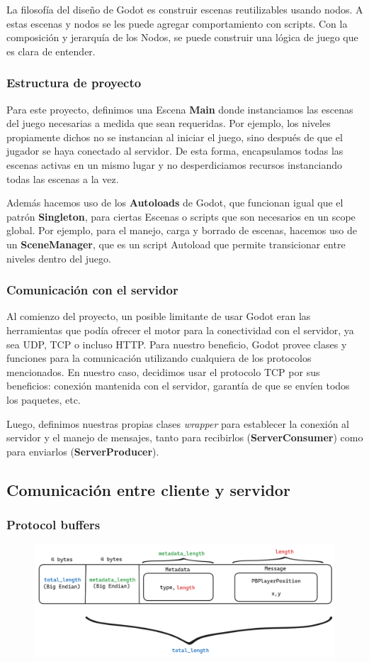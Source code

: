 La filosofía del diseño de Godot es construir escenas reutilizables usando nodos. A estas escenas y nodos se les puede agregar comportamiento con scripts. Con la composición y jerarquía de los Nodos, se puede construir una lógica de juego que es clara de entender.

\subsubsection{Estructura de proyecto}

Para este proyecto, definimos una Escena \textbf{Main} donde instanciamos las escenas del juego necesarias a medida que sean requeridas. Por ejemplo, los niveles propiamente dichos no se instancian al iniciar el juego, sino después de que el jugador se haya conectado al servidor. De esta forma, encapsulamos todas las escenas activas en un mismo lugar y no desperdiciamos recursos instanciando todas las escenas a la vez.

Además hacemos uso de los \textbf{Autoloads} de Godot, que funcionan igual que el patrón \textbf{Singleton}, para ciertas Escenas o scripts que son necesarios en un scope global. Por ejemplo, para el manejo, carga y borrado de escenas, hacemos uso de un \textbf{SceneManager}, que es un script Autoload que permite transicionar entre niveles dentro del juego. 

\subsubsection{Comunicación con el servidor}

Al comienzo del proyecto, un posible limitante de usar Godot eran las herramientas que podía ofrecer el motor para la conectividad con el servidor, ya sea UDP, TCP o incluso HTTP. Para nuestro beneficio, Godot provee clases y funciones para la comunicación utilizando cualquiera de los protocolos mencionados. En nuestro caso, decidimos usar el protocolo TCP por sus beneficios: conexión mantenida con el servidor, garantía de que se envíen todos los paquetes, etc.

Luego, definimos nuestras propias clases \textit{wrapper} para establecer la conexión al servidor y el manejo de mensajes, tanto para recibirlos (\textbf{ServerConsumer}) como para enviarlos (\textbf{ServerProducer}).

\subsection{Comunicación entre cliente y servidor}

\subsubsection{Protocol buffers}

\begin{figure}[htbp]
    \centering
    \includegraphics[width=1.0\textwidth]{../assets/protobuf.png}
\end{figure}